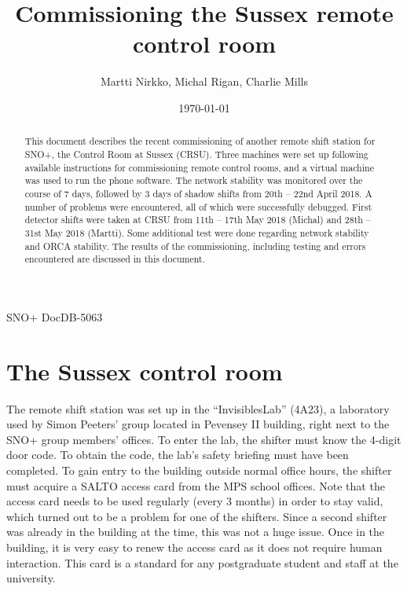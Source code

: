\documentclass[a4paper,10pt]{article}
\title{Commissioning the Sussex remote control room}
\author{Martti Nirkko, Michal Rigan, Charlie Mills}
\affil{University of Sussex}
\date{\today}
\begin{document}
\maketitle

\begin{flushright}
\vspace{-6cm}
SNO+ DocDB-5063
\vspace{6cm}
\end{flushright}

\begin{abstract}
This document describes the recent commissioning of another remote shift station for SNO+, the Control Room at Sussex (CRSU). Three machines were set up following available instructions for commissioning remote control rooms, and a virtual machine was used to run the phone software. The network stability was monitored over the course of 7 days, followed by 3 days of shadow shifts from 20th -- 22nd April 2018. A number of problems were encountered, all of which were successfully debugged. First detector shifts were taken at CRSU from 11th -- 17th May 2018 (Michal) and 28th -- 31st May 2018 (Martti). Some additional test were done regarding network stability and ORCA stability. The results of the commissioning, including testing and errors encountered are discussed in this document.
\end{abstract}


\section{The Sussex control room}
The remote shift station was set up in the ``InvisiblesLab'' (4A23), a laboratory used by Simon Peeters' group located in Pevensey II building, right next to the SNO+ group members' offices. To enter the lab, the shifter must know the 4-digit door code. To obtain the code, the lab's safety briefing must have been completed. To gain entry to the building outside normal office hours, the shifter must acquire a SALTO access card from the MPS school offices. Note that the access card needs to be used regularly (every 3 months) in order to stay valid, which turned out to be a problem for one of the shifters. Since a second shifter was already in the building at the time, this was not a huge issue. Once in the building, it is very easy to renew the access card as it does not require human interaction. This card is a standard for any postgraduate student and staff at the university.
\end{document}
